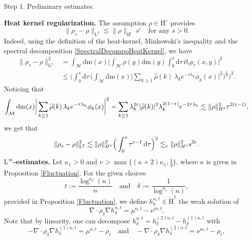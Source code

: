 \documentclass[11pt,a4paper,oneside]{amsart}
\numberwithin{equation}{section}
\newcommand{\dd}{\mathrm{d}}
\newcommand{\LL}{\mathrm{L}}
\newcommand{\m}{\mathrm{m}}
\begin{document}
{\sc Step 1. Preliminary estimates. }

%
\medskip
%

\textbf{Heat kernel regularization. }The assumption $\rho\in \mathrm{H}^\varepsilon$ provides 
%
\begin{equation}\label{ApproximationRho}
%
\|\rho_s-\rho\|_{\LL^2}\lesssim \|\rho\|_{\mathrm{H}^\varepsilon} \,s^{\varepsilon}\quad\text{for any $s>0$}.
%
\end{equation}
%
%
Indeed, using the definition of the heat-kernel, Minkowski's inequality and the spectral decomposition \eqref{SpectralDecompoHeatKernel}, we have
%
\begin{align*}
%
\|\rho_{s}-\rho\|^2_{\LL^2}&=\int_{\mathcal{M}}\dd \m(x)\bigg\vert\int_{\mathcal{M}}\rho(y)\dd\m(y)\int_{0}^{s}\dd\tau\,\partial_{\tau}p_{\tau}(x,y)\bigg\vert^2\\
&\leq\bigg(\int_{0}^{s}\dd\tau\,\bigg(\int_{\mathcal{M}}\dd\m(x)\bigg\vert\sum_{k\geq 1}\widehat{\rho}(k)\, \lambda_k e^{-\tau\lambda_k}\phi_k(x)\bigg\vert^2\bigg)^{\frac{1}{2}}\bigg)^2.
%
\end{align*}
%
Noticing that 
%
$$\int_{\mathcal{M}}\dd\m(x)\bigg\vert\sum_{k\geq 1}\widehat{\rho}(k)\, \lambda_k e^{-\tau\lambda_k}\phi_k(x)\bigg\vert^2=\sum_{k\geq 1}\lambda^{2\varepsilon}_k\vert\widehat{\rho}(k)\vert^2\lambda^{2(1-\varepsilon)}_k e^{-2\tau\lambda_k}\lesssim \|\rho\|^2_{{\rm H}^{\varepsilon}}\tau^{2(\varepsilon-1)},$$
%
we get that
%
$$\|\rho_{s}-\rho\|^2_{\LL^2}\lesssim \|\rho\|^2_{{\rm H}^{\varepsilon}}\Big(\int_{0}^{s}\tau^{\varepsilon-1}\,\dd\tau\Big)^2\lesssim_{\varepsilon} \|\rho\|^2_{{\rm H}^{\varepsilon}}s^{2\varepsilon}.$$
%
\textbf{$\LL^\infty$-estimates. }Let $\kappa_1>0$ and $\upsilon>\max\{(\kappa+2)\kappa_1,\frac{1}{\eta}\}$, where $\kappa$ is given in Proposition \ref{Fluctuation}. For the given choices 
%
\begin{equation}\label{Choicestdelta}
%
t:=\frac{\log^{\kappa_2}(n)}{n}\quad\text{and}\quad\delta:=\frac{1}{\log^{\kappa_1}(n)},
%
\end{equation}
%
provided in Proposition \ref{Fluctuation}, we define $h^{n,t}_\delta\in \dot{\mathrm{H}}^1$ the weak solution of 
%
\begin{equation}\label{Equationhdelta}
%
\nabla\cdot\rho_\delta \nabla h^{n,t}_\delta=\mu^{n,t}-\nu^{m,t}.
%
\end{equation}
%
Note that by linearity, one can decompose $h^{n,t}_\delta=h^{(2)n,t}_\delta-h^{(1)n,t}_\delta$ with 
%
\begin{equation}\label{Decompohnt}
%
-\nabla\cdot\rho_\delta \nabla h^{(1)n,t}_\delta=\mu^{n,t}-\rho_t\quad\text{and}\quad-\nabla\cdot\rho_\delta \nabla h^{(2)n,t}_\delta=\nu^{m,t}-\rho_t,
%
\end{equation}
\end{document}
